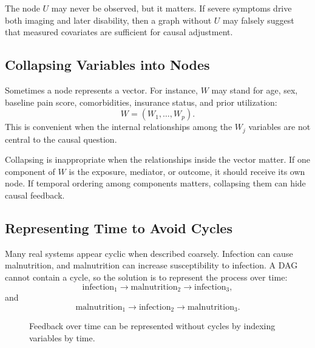 The node $U$ may never be observed, but it matters. If severe symptoms drive both imaging and later disability, then a graph without $U$ may falsely suggest that measured covariates are sufficient for causal adjustment.

\subsection{Collapsing Variables into Nodes}

Sometimes a node represents a vector. For instance, $W$ may stand for age, sex, baseline pain score, comorbidities, insurance status, and prior utilization:
\[
W=(W_1,\ldots,W_p).
\]
This is convenient when the internal relationships among the $W_j$ variables are not central to the causal question.

Collapsing is inappropriate when the relationships inside the vector matter. If one component of $W$ is the exposure, mediator, or outcome, it should receive its own node. If temporal ordering among components matters, collapsing them can hide causal feedback.

\subsection{Representing Time to Avoid Cycles}

Many real systems appear cyclic when described coarsely. Infection can cause malnutrition, and malnutrition can increase susceptibility to infection. A DAG cannot contain a cycle, so the solution is to represent the process over time:
\[
\text{infection}_1 \to \text{malnutrition}_2 \to \text{infection}_3,
\]
and
\[
\text{malnutrition}_1 \to \text{infection}_2 \to \text{malnutrition}_3.
\]

\begin{figure}[H]
\centering
{}
\caption{Feedback over time can be represented without cycles by indexing variables by time.}
\end{figure}

